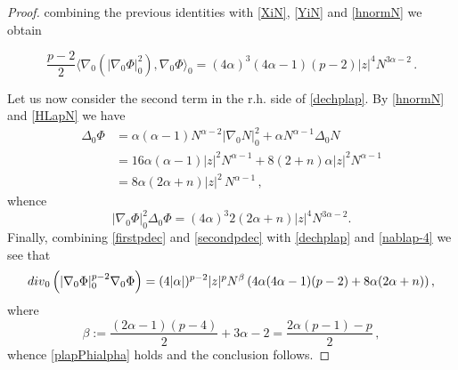 \documentclass[10pt]{amsart}
\numberwithin{equation}{section}
\newtheorem{remark}[theorem]{Remark}
\theoremstyle{definition}
\newcommand{\scal}[2]{\langle {#1},{#2}\rangle}
\newcommand{\hgrad}{\nabla_{\mathnormal{H}}}
\newcommand{\hdiv}{\mathrm{div}_{\mathnormal{H}}}
\begin{document}
\begin{proof}
\noindent combining the previous identities with \eqref{XiN}, \eqref{YiN} and \eqref{hnormN} we obtain

\begin{equation}
\label{firstpdec}
\frac{p-2}2\scal{\nabla_0\left( |\nabla_0 \Phi|_0^{2}\right)}{\nabla_0 \Phi}_0 = (4 \alpha)^3 (4\alpha-1) (p-2) |z|^4  N^{3\alpha -2} \, .
\end{equation}



Let us now consider the second term in the r.h. side of \eqref{dechplap}. By \eqref{hnormN} and \eqref{HLapN} we have 
\begin{equation}
\label{Delta0Phi}
\begin{aligned}
\Delta_0 \Phi &= \alpha (\alpha-1)N^{\alpha-2}|\nabla_0 N|_0^2 + \alpha N^{\alpha-1} \Delta_0 N \\
&= 16 \alpha (\alpha-1)|z|^2 N^{\alpha-1} + 8(2+n) \alpha |z|^2 N^{\alpha -1} \\
&= 8\alpha (2\alpha +n) |z|^2 \, N^{\alpha-1} \, , 
\end{aligned}
\end{equation}
whence
\begin{equation}
\label{secondpdec}
|\nabla_0 \Phi|_0^{2}\Delta_0 \Phi = (4 \alpha)^{3}2  (2\alpha +n) |z|^4 N^{3\alpha-2}.
\end{equation}
Finally, combining \eqref{firstpdec} and \eqref{secondpdec} with \eqref{dechplap} and \eqref{nablap-4} we see that
$$  {\rm div}_0\left(|\nabla_0 \Phi|_0^{p-2}\nabla_0 \Phi \right) = (4 |\alpha|)^{p-2}|z|^p N^{\beta} \left(4\alpha(4\alpha -1)(p-2) + 8\alpha(2\alpha +n) \right),$$
\noindent where
$$\beta := \dfrac{(2\alpha-1)(p-4)}{2} + 3\alpha -2 = \dfrac{2\alpha(p-1)-p}{2} \, ,$$
whence \eqref{plapPhialpha} holds and the conclusion follows.
\end{proof}



\end{document}
